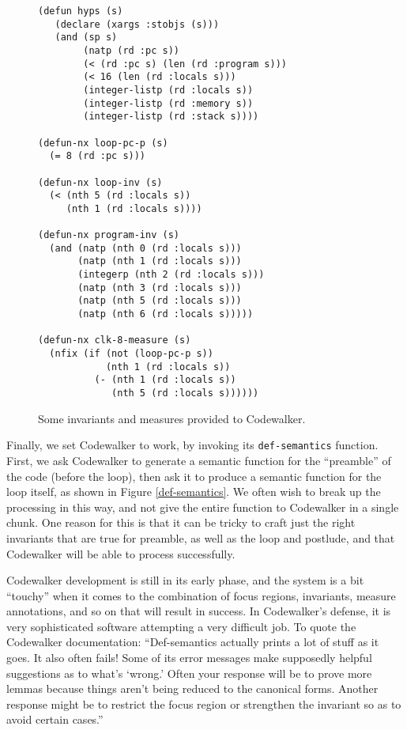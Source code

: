 \documentclass{eptcs}
\begin{document}
\begin{figure*}
\begin{verbatim}
(defun hyps (s)
   (declare (xargs :stobjs (s)))
   (and (sp s)
        (natp (rd :pc s))
        (< (rd :pc s) (len (rd :program s)))
        (< 16 (len (rd :locals s)))
        (integer-listp (rd :locals s))
        (integer-listp (rd :memory s))
        (integer-listp (rd :stack s))))

(defun-nx loop-pc-p (s)
  (= 8 (rd :pc s)))

(defun-nx loop-inv (s)
  (< (nth 5 (rd :locals s))
     (nth 1 (rd :locals s))))

(defun-nx program-inv (s)
  (and (natp (nth 0 (rd :locals s)))
       (natp (nth 1 (rd :locals s)))
       (integerp (nth 2 (rd :locals s)))
       (natp (nth 3 (rd :locals s)))
       (natp (nth 5 (rd :locals s)))
       (natp (nth 6 (rd :locals s)))))

(defun-nx clk-8-measure (s)
  (nfix (if (not (loop-pc-p s))
            (nth 1 (rd :locals s))
          (- (nth 1 (rd :locals s))
             (nth 5 (rd :locals s))))))
\end{verbatim}
\hrulefill
\caption{Some invariants and measures provided to Codewalker.}
\label{invariants}
\end{figure*}

Finally, we set Codewalker to work, by invoking its
\texttt{def-semantics}  function.  First, we ask Codewalker to 
generate a semantic function for the ``preamble'' of the code 
(before the loop), then ask it to produce a semantic function 
for the loop itself, as shown in Figure \ref{def-semantics}.  
We often wish to break up the processing in this way, and not 
give the entire function to Codewalker in a single chunk.  One reason 
for this is that it can be tricky to craft just the right invariants that are 
true for preamble, as well as the loop and postlude, and that 
Codewalker will be able to process successfully.  
  
Codewalker development is still in its early phase, and the system is a bit 
``touchy'' when it comes to the combination of 
focus regions, invariants, measure annotations, and so on 
that will result in success.  In Codewalker's defense, it is 
very sophisticated software attempting a very difficult job.  
To quote the Codewalker documentation: 
``Def-semantics actually prints a lot of stuff as it goes.  It also often
fails!  Some of its error messages make supposedly helpful suggestions as to
what's `wrong.'  Often your response will be to prove more lemmas because
things aren't being reduced to the canonical forms.  Another response
might be to restrict the focus region or strengthen the invariant so as to
avoid certain cases.''~\cite{Codewalker}
\end{document}
